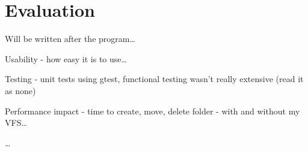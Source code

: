 \chapter{Evaluation}

Will be written after the program\ldots

Usability - how easy it is to use\ldots

Testing - unit tests using gtest, functional testing wasn't really extensive (read it as none)

Performance impact - time to create, move, delete folder - with and without my VFS\ldots

\ldots